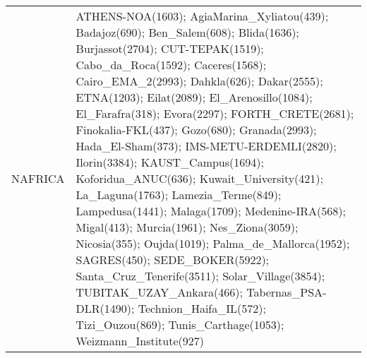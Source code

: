 \documentclass[journal abbreviation, manuscript]{copernicus}
\begin{document}
\begin{table}
\begin{tabularx}{\textwidth}{lX}
   NAFRICA &                                                                                                                                                                                                                                                                                                                                                                                                                                                                                                                                                                                                                                                                                                                                                                                                                                                                                                                                                                                                                                                                                                                                                                                                                                                                                                                                                                                                                                                                                      ATHENS-NOA(1603); AgiaMarina\_Xyliatou(439); Badajoz(690); Ben\_Salem(608); Blida(1636); Burjassot(2704); CUT-TEPAK(1519); Cabo\_da\_Roca(1592); Caceres(1568); Cairo\_EMA\_2(2993); Dahkla(626); Dakar(2555); ETNA(1203); Eilat(2089); El\_Arenosillo(1084); El\_Farafra(318); Evora(2297); FORTH\_CRETE(2681); Finokalia-FKL(437); Gozo(680); Granada(2993); Hada\_El-Sham(373); IMS-METU-ERDEMLI(2820); Ilorin(3384); KAUST\_Campus(1694); Koforidua\_ANUC(636); Kuwait\_University(421); La\_Laguna(1763); Lamezia\_Terme(849); Lampedusa(1441); Malaga(1709); Medenine-IRA(568); Migal(413); Murcia(1961); Nes\_Ziona(3059); Nicosia(355); Oujda(1019); Palma\_de\_Mallorca(1952); SAGRES(450); SEDE\_BOKER(5922); Santa\_Cruz\_Tenerife(3511); Solar\_Village(3854); TUBITAK\_UZAY\_Ankara(466); Tabernas\_PSA-DLR(1490); Technion\_Haifa\_IL(572); Tizi\_Ouzou(869); Tunis\_Carthage(1053); Weizmann\_Institute(927) \\

\end{tabularx}
\end{table}
\end{document}

